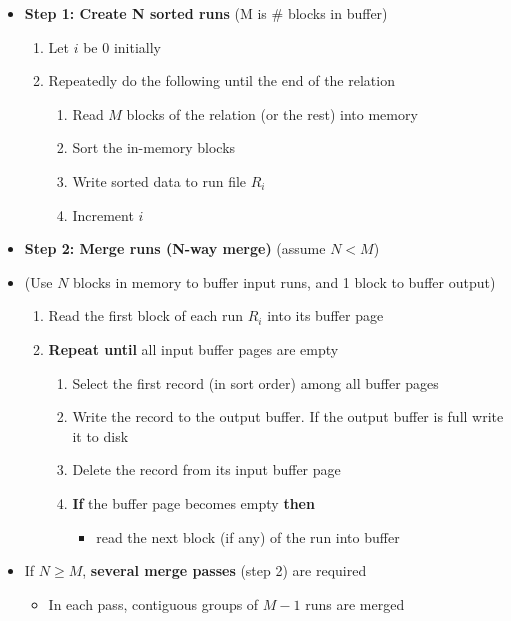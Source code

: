 \begin{itemize}[label=\(\rhd\)]
    \item \textbf{Step 1: Create N sorted runs} (M is \# blocks in buffer)
    \begin{enumerate}
        \item Let $i$ be 0 initially 
        \item Repeatedly do the following until the end of the relation
        \begin{enumerate}[label*=\arabic*.]
            \item Read $M$ blocks of the relation (or the rest) into memory
            \item Sort the in-memory blocks
            \item Write sorted data to run file $R_i$
            \item Increment $i$
        \end{enumerate}
    \end{enumerate}
    \item \textbf{Step 2: Merge runs (N-way merge)} (assume $N<M$)
    \item[] (Use $N$ blocks in memory to buffer input runs, and 1 block to buffer output)
    \begin{enumerate}
        \item Read the first block of each run $R_i$ into its buffer page
        \item \textbf{Repeat until} all input buffer pages are empty
        \begin{enumerate}[label*=\arabic*.]
            \item Select the first record (in sort order) among all buffer pages
            \item Write the record to the output buffer. If the output buffer is full write it to disk 
            \item Delete the record from its input buffer page
            \item \textbf{If} the buffer page becomes empty \textbf{then}
            \begin{itemize}[label=\(\rhd\)]
                \item[] read the next block (if any) of the run into buffer
            \end{itemize}
        \end{enumerate}
    \end{enumerate}
    \item If $N \geq M$, \textbf{several merge passes} (step 2) are required
    \begin{itemize}[label=\(\rhd\)]
        \item In each pass, contiguous groups of $M-1$ runs are merged
    \end{itemize}
\end{itemize}
